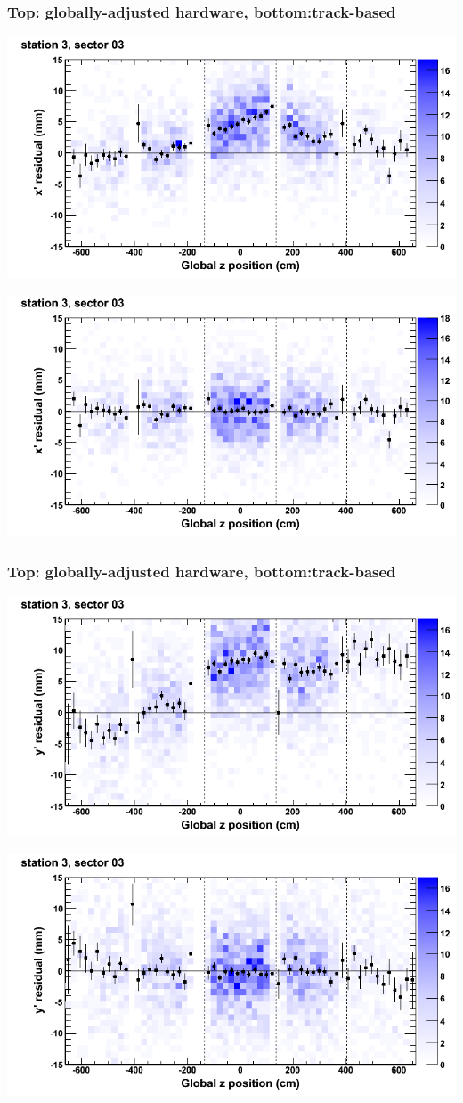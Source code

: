 \documentclass[compress]{beamer}
\begin{document}
\begin{frame}
\frametitle{Top: globally-adjusted hardware, bottom:track-based}
\includegraphics[width=0.7\linewidth]{NOV4_mapplots_HW/DTvsz_st3sec03_x.png}

\includegraphics[width=0.7\linewidth]{NOV4_mapplots/DTvsz_st3sec03_x.png}
\end{frame}

\begin{frame}
\frametitle{Top: globally-adjusted hardware, bottom:track-based}
\includegraphics[width=0.7\linewidth]{NOV4_mapplots_HW/DTvsz_st3sec03_y.png}

\includegraphics[width=0.7\linewidth]{NOV4_mapplots/DTvsz_st3sec03_y.png}
\end{frame}
\end{document}

